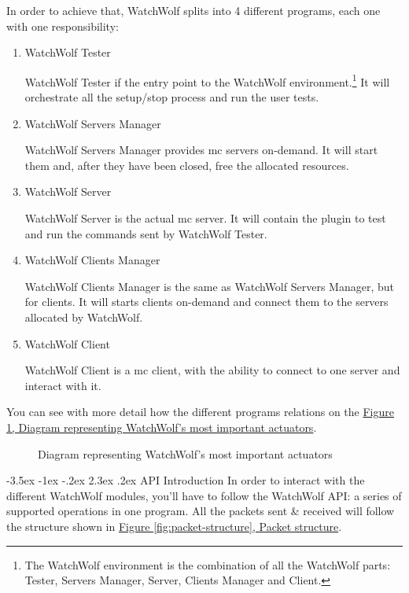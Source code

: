 \documentclass[11pt]{article}
\makeatletter
\renewcommand\section{\@startsection {section}{1}{\z@}%
                                       {-3.5ex \@plus -1ex \@minus -.2ex}%
                                       {2.3ex \@plus.2ex}%
                                       {\normalfont\fontfamily{phv}\fontsize{16}{19}\bfseries}}
\makeatother
\begin{document}
In order to achieve that, WatchWolf splits into 4 different programs, each one with one responsibility:
\begin{enumerate}
	\item WatchWolf Tester
	
		WatchWolf Tester if the entry point to the WatchWolf environment.\footnote{The WatchWolf environment is the combination of all the WatchWolf parts: Tester, Servers Manager, Server, Clients Manager and Client.} It will orchestrate all the setup/stop process and run the user tests.
	
	\item WatchWolf Servers Manager
	
		WatchWolf Servers Manager provides \acrshort{mc} servers on-demand. It will start them and, after they have been closed, free the allocated resources.
	
	\item WatchWolf Server
	
		WatchWolf Server is the actual \acrshort{mc} server. It will contain the plugin to test and run the commands sent by WatchWolf Tester.
	
	\item WatchWolf Clients Manager
	
		WatchWolf Clients Manager is the same as WatchWolf Servers Manager, but for clients. It will starts clients on-demand and connect them to the servers allocated by WatchWolf.
	
	\item WatchWolf Client
	
		WatchWolf Client is a \acrshort{mc} client, with the ability to connect to one server and interact with it.
\end{enumerate}

You can see with more detail how the different programs relations on the \hyperref[fig:diagram]{Figure \ref{fig:diagram}, Diagram representing WatchWolf's most important actuators}.

\begin{figure}[H]
	\centering
	
	
	\caption{Diagram representing WatchWolf's most important actuators}
	\label{fig:diagram}
\end{figure}

\section{API Introduction}
In order to interact with the different WatchWolf modules, you'll have to follow the WatchWolf API: a series of supported operations in one program. All the packets sent \& received will follow the structure shown in \hyperref[fig:packet-structure]{Figure \ref{fig:packet-structure}, Packet structure}.
\end{document}
